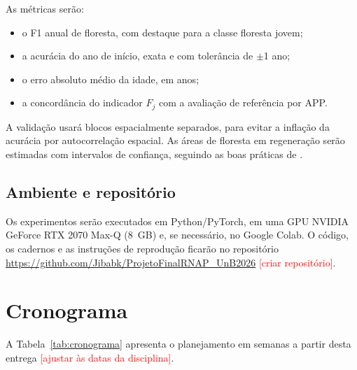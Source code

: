 \documentclass[conference]{IEEEtran}
\newcommand{\pendente}[1]{\textcolor{red}{[#1]}}
\begin{document}
As métricas serão:
\begin{itemize}
\item o F1 anual de floresta, com destaque para a classe floresta jovem;
\item a acurácia do ano de início, exata e com tolerância de $\pm$1 ano;
\item o erro absoluto médio da idade, em anos;
\item a concordância do indicador $F_j$ com a avaliação de referência por APP.
\end{itemize}
A validação usará blocos espacialmente separados, para evitar a inflação da acurácia por autocorrelação espacial. As áreas de floresta em regeneração serão estimadas com intervalos de confiança, seguindo as boas práticas de \citet{olofsson2014}.

\subsection{Ambiente e repositório}

Os experimentos serão executados em Python/PyTorch, em uma GPU NVIDIA GeForce RTX 2070 Max-Q (8~GB) e, se necessário, no Google Colab. O código, os cadernos e as instruções de reprodução ficarão no repositório \url{https://github.com/Jibabk/ProjetoFinalRNAP_UnB2026} \pendente{criar repositório}.

\section{Cronograma}\label{sec:cronograma}

A Tabela~\ref{tab:cronograma} apresenta o planejamento em semanas a partir desta entrega \pendente{ajustar às datas da disciplina}.
\end{document}
